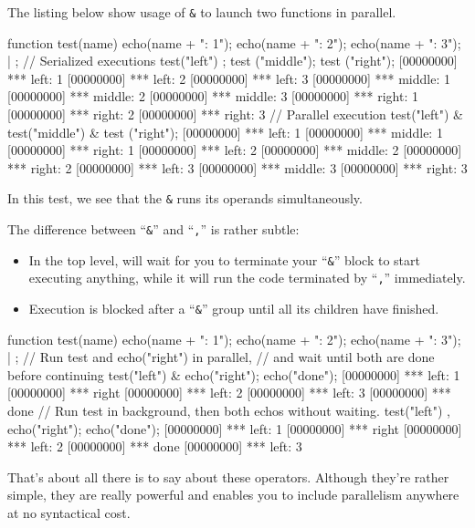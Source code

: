 The listing below show usage of \lstinline{&} to
launch two functions in parallel.

\begin{urbiscript}
function test(name)
{
  echo(name + ": 1");
  echo(name + ": 2");
  echo(name + ": 3");
} | {};
// Serialized executions
test("left") ; test ("middle"); test ("right");
[00000000] *** left: 1
[00000000] *** left: 2
[00000000] *** left: 3
[00000000] *** middle: 1
[00000000] *** middle: 2
[00000000] *** middle: 3
[00000000] *** right: 1
[00000000] *** right: 2
[00000000] *** right: 3
// Parallel execution
test("left") & test("middle") & test ("right");
[00000000] *** left: 1
[00000000] *** middle: 1
[00000000] *** right: 1
[00000000] *** left: 2
[00000000] *** middle: 2
[00000000] *** right: 2
[00000000] *** left: 3
[00000000] *** middle: 3
[00000000] *** right: 3
\end{urbiscript}

In this test, we see that the \lstinline{&} runs its operands
simultaneously.

The difference between ``\lstinline{&}'' and ``\lstinline{,}'' is
rather subtle:

\begin{itemize}
\item In the top level, will wait for you to terminate your
  ``\lstinline{&}'' block to start executing anything, while it will
  run the code terminated by ``\lstinline{,}'' immediately.
\item Execution is blocked after a ``\lstinline{&}'' group until all
  its children have finished.
\end{itemize}

\begin{urbiscript}
function test(name)
{
  echo(name + ": 1");
  echo(name + ": 2");
  echo(name + ": 3");
} | {};
// Run test and echo("right") in parallel,
// and wait until both are done before continuing
test("left") & echo("right"); echo("done");
[00000000] *** left: 1
[00000000] *** right
[00000000] *** left: 2
[00000000] *** left: 3
[00000000] *** done
// Run test in background, then both echos without waiting.
test("left") , echo("right"); echo("done");
[00000000] *** left: 1
[00000000] *** right
[00000000] *** left: 2
[00000000] *** done
[00000000] *** left: 3
\end{urbiscript}

That's about all there is to say about these operators. Although
they're rather simple, they are really powerful and enables you to
include parallelism anywhere at no syntactical cost.


